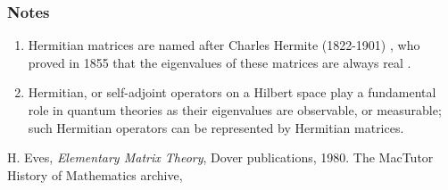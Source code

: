 \documentclass{article}
\begin{document}
\subsubsection*{Notes}
\begin{enumerate}
\item Hermitian matrices are named after Charles Hermite (1822-1901) \cite{hermite}, who proved  in 1855 that the 
eigenvalues of these matrices are always real \cite{eves}.
\item Hermitian, or self-adjoint operators on a Hilbert space play a fundamental
role in quantum theories as their eigenvalues are observable, or measurable; such
Hermitian operators can be represented by Hermitian matrices.
\end{enumerate}

\begin{thebibliography}{9}
  H. Eves,
 \emph{Elementary Matrix Theory},
 Dover publications, 1980.
 The MacTutor History of Mathematics archive, 
\end{thebibliography}
\end{document}
